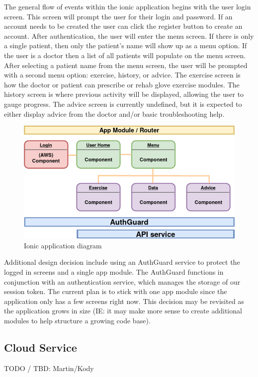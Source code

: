 \documentclass[a4paper,10pt]{article}
\begin{document}
            The general flow of events within the ionic application begins with the user login screen. This screen will prompt the user for their login and password. If an account needs to be created the user can click the register button to create an account. After authentication, the user will enter the menu screen. If there is only a single patient, then only the patient's name will show up as a menu option. If the user is a doctor then a list of all patients will populate on the menu screen. After selecting a patient name from the menu screen, the user will be prompted with a second menu option: exercise, history, or advice. The exercise screen is how the doctor or patient can prescribe or rehab glove exercise modules. The history screen is where previous activity will be displayed, allowing the user to gauge progress. The advice screen is currently undefined, but it is expected to either display advice from the doctor and/or basic troubleshooting help.
            \begin{figure}[h]
            \centering
            \includegraphics[width=140mm, scale=1]{ionicAppLayout}
            \caption{Ionic application diagram}
            \end{figure}
            
            Additional design decision include using an AuthGuard service to protect the logged in screens and a single app module. The AuthGuard functions in conjunction with an authentication service, which manages the storage of our session token. The current plan is to stick with one app module since the application only has a few screens right now. This decision may be revisited as the application grows in size (IE: it may make more sense to create additional modules to help structure a growing code base). 
            
        \subsection{Cloud Service}
            TODO / TBD: Martin/Kody
            
\end{document}
